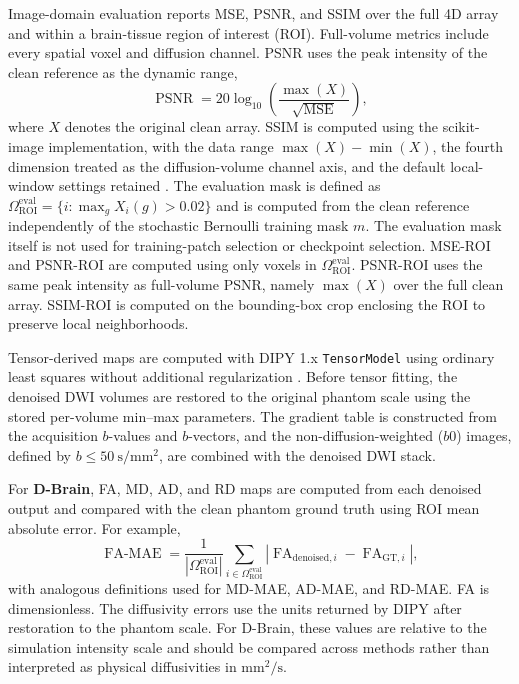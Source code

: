 \documentclass[preprint,12pt]{elsarticle}
\begin{document}
Image-domain evaluation reports MSE, PSNR, and SSIM over the full 4D array and within a brain-tissue region of interest (ROI). Full-volume metrics include every spatial voxel and diffusion channel. PSNR uses the peak intensity of the clean reference as the dynamic range,
\begin{equation}
  \operatorname{PSNR} = 20\log_{10}\left(\frac{\max(X)}{\sqrt{\operatorname{MSE}}}\right),
  \label{eq:psnr}
\end{equation}
where $X$ denotes the original clean array. SSIM is computed using the scikit-image implementation, with the data range $\max(X)-\min(X)$, the fourth dimension treated as the diffusion-volume channel axis, and the default local-window settings retained \cite{vanderwalt2014skimage}. The evaluation mask is defined as $\Omega_{\mathrm{ROI}}^{\mathrm{eval}}=\{i:\max_g X_i(g)>0.02\}$ and is computed from the clean reference independently of the stochastic Bernoulli training mask $m$. The evaluation mask itself is not used for training-patch selection or checkpoint selection. MSE-ROI and PSNR-ROI are computed using only voxels in $\Omega_{\mathrm{ROI}}^{\mathrm{eval}}$. PSNR-ROI uses the same peak intensity as full-volume PSNR, namely $\max(X)$ over the full clean array. SSIM-ROI is computed on the bounding-box crop enclosing the ROI to preserve local neighborhoods.

Tensor-derived maps are computed with DIPY 1.x \texttt{TensorModel} using ordinary least squares without additional regularization \cite{garyfallidis2014dipy}. Before tensor fitting, the denoised DWI volumes are restored to the original phantom scale using the stored per-volume min--max parameters. The gradient table is constructed from the acquisition $b$-values and $b$-vectors, and the non-diffusion-weighted ($b0$) images, defined by $b\leq50~\mathrm{s/mm^2}$, are combined with the denoised DWI stack.

For \textbf{D-Brain}, FA, MD, AD, and RD maps are computed from each denoised output and compared with the clean phantom ground truth using ROI mean absolute error. For example,
\begin{equation}
  \operatorname{FA\mbox{-}MAE}=\frac{1}{|\Omega_{\mathrm{ROI}}^{\mathrm{eval}}|}\sum_{i\in\Omega_{\mathrm{ROI}}^{\mathrm{eval}}}|\operatorname{FA}_{\mathrm{denoised},i}-\operatorname{FA}_{\mathrm{GT},i}|,
  \label{eq:fa-mae}
\end{equation}
with analogous definitions used for MD-MAE, AD-MAE, and RD-MAE. FA is dimensionless. The diffusivity errors use the units returned by DIPY after restoration to the phantom scale. For D-Brain, these values are relative to the simulation intensity scale and should be compared across methods rather than interpreted as physical diffusivities in $\mathrm{mm^2/s}$.
\end{document}
